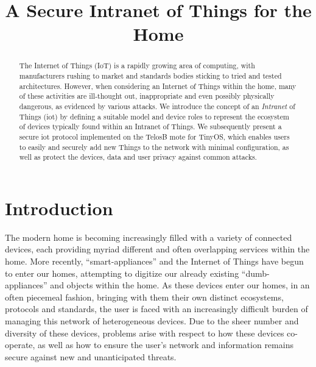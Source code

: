 \documentclass[conference]{./sty/IEEEtran}
\begin{document}
%
\title{A Secure Intranet of Things for the Home}


\author{
}

\maketitle


\begin{abstract}
The Internet of Things (IoT) is a rapidly growing area of computing, with manufacturers rushing to market and standards bodies sticking to tried and tested architectures. However, when considering an Internet of Things within the home, many of these activities are ill-thought out, inappropriate and even possibly physically dangerous, as evidenced by various attacks\cite{BelkinWemo,IoTWorm}. We introduce the concept of an \textit{Intranet} of Things (iot) by defining a suitable model and device roles to represent the ecosystem of devices typically found within an Intranet of Things. We subsequently present a secure iot protocol implemented on the TelosB mote for TinyOS, which enables users to easily and securely add new Things to the network with minimal configuration, as well as protect the devices, data and user privacy against common attacks. 
\end{abstract}


\section{Introduction}
The modern home is becoming increasingly filled with a variety of connected devices, each providing myriad different and often overlapping services within the home. More recently, ``smart-appliances'' and the Internet of Things have begun to enter our homes, attempting to digitize our already existing ``dumb-appliances'' and objects within the home. As these devices enter our homes, in an often piecemeal fashion, bringing with them their own distinct ecosystems, protocols and standards, the user is faced with an increasingly difficult burden of managing this network of heterogeneous devices. Due to the sheer number and diversity of these devices, problems arise with respect to how these devices co-operate, as well as how to ensure the user's network and information remains secure against new and unanticipated threats.
\end{document}

